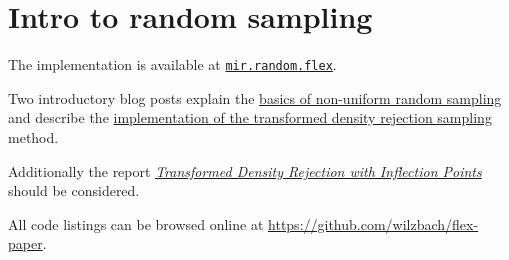 \section{Intro to random sampling}

The implementation is available at \href{http://docs.mir.dlang.io/latest/mir_random_flex.html}{\texttt{mir.random.flex}}.

Two introductory blog posts explain the \href{http://blog.mir.dlang.io/random/2016/08/19/intro-to-random-sampling.html}{basics of non-uniform random sampling}
and describe the \href{http://blog.mir.dlang.io/random/2016/08/22/transformed-density-rejection-sampling.html}{implementation of the transformed density rejection sampling} method.

Additionally the report \textit{\href{http://epub.wu.ac.at/3158/1/techreport-110.pdf}{Transformed Density Rejection with Inflection Points}}
should be considered.

All code listings can be browsed online at \url{https://github.com/wilzbach/flex-paper}.
